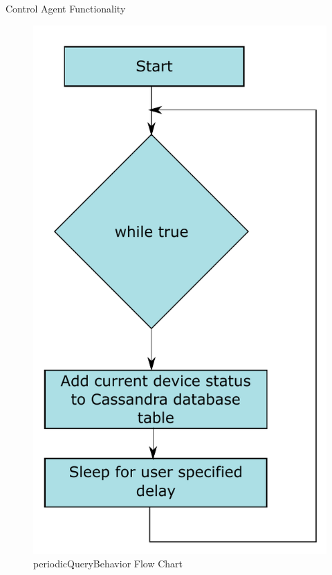 \documentclass{beamer}
\begin{document}
\begin{frame}{Control Agent Functionality}{}
    \begin{figure}
        \centering
        \includegraphics[scale=0.3]{figs/periodicQueryBehaviorFlow.pdf}
        \caption{periodicQueryBehavior Flow Chart}
        \label{fig:periodicQueryBehavior}
    \end{figure}
\end{frame}
\end{document}
